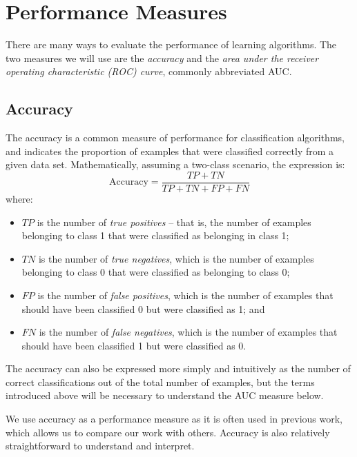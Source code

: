 \section{Performance Measures}
There are many ways to evaluate the performance of learning algorithms. The
two measures we will use are the \textit{accuracy} and the \textit{area under
the receiver operating characteristic (ROC) curve}, commonly abbreviated AUC.

\subsection{Accuracy}
The accuracy is a common measure of performance for classification algorithms,
and indicates the proportion of examples that were classified correctly from
a given data set. Mathematically, assuming a two-class scenario, the expression
is:
\begin{equation*}
\mathrm{Accuracy} = \dfrac{TP + TN}{TP + TN + FP + FN}
\end{equation*}
where:
\begin{itemize}
  \item $TP$ is the number of \textit{true positives} -- that is, the number of
  examples belonging to class 1 that were classified as belonging in class 1;
  \item $TN$ is the number of \textit{true negatives}, which is the number of
  examples belonging to class 0 that were classified as belonging to class 0;
  \item $FP$ is the number of \textit{false positives}, which is the number of
  examples that should have been classified 0 but were classified as 1; and
  \item $FN$ is the number of \textit{false negatives}, which is the number of
  examples that should have been classified 1 but were classified as 0.
\end{itemize}

The accuracy can also be expressed more simply and intuitively as
the number of correct classifications out of the total number of examples,
but the terms introduced above will be necessary to understand the
AUC measure below.

We use accuracy as a performance measure as it is often used in previous work,
which allows us to compare our work with others. Accuracy is also relatively
straightforward to understand and interpret.

